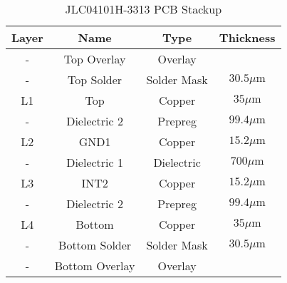 \begin{table}[!hbt]
    \centering
    \begin{tabular}{| c || c | c | c |}
        \hline
        Layer & Name           & Type        & Thickness             \\
        \hline
        \hline
        -     & Top Overlay    & Overlay     &                       \\
        -     & Top Solder     & Solder Mask & $30.5 \si{\mu\meter}$ \\
        L1    & Top            & Copper      & $35 \si{\mu\meter}$   \\
        -     & Dielectric 2   & Prepreg     & $99.4 \si{\mu\meter}$ \\
        L2    & GND1           & Copper      & $15.2 \si{\mu\meter}$ \\
        -     & Dielectric 1   & Dielectric  & $700 \si{\mu\meter}$  \\
        L3    & INT2           & Copper      & $15.2 \si{\mu\meter}$ \\
        -     & Dielectric 2   & Prepreg     & $99.4 \si{\mu\meter}$ \\
        L4    & Bottom         & Copper      & $35 \si{\mu\meter}$   \\
        -     & Bottom Solder  & Solder Mask & $30.5 \si{\mu\meter}$ \\
        -     & Bottom Overlay & Overlay     &                       \\
        \hline
    \end{tabular}
    \caption{JLC04101H-3313 PCB Stackup}
    \label{tab:stackup}
\end{table}
\FloatBarrier